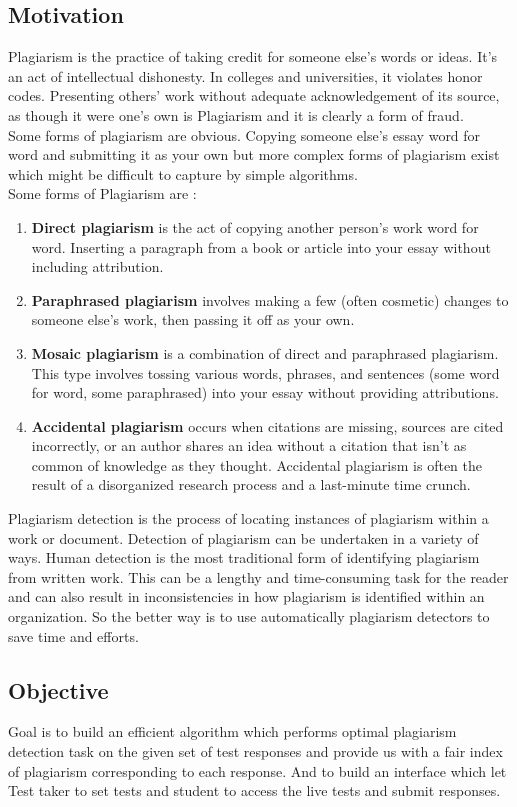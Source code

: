 \subsection{Motivation}

Plagiarism is the practice of taking credit for someone else's words or ideas. It's an act of intellectual dishonesty. In colleges and universities, it violates honor codes. Presenting others' work without adequate acknowledgement of its source, as though it were one’s own is
Plagiarism and it is clearly a form of fraud. \\
Some forms of plagiarism are obvious. Copying someone else's essay word for word and submitting it as your own but more complex forms of plagiarism exist which might be difficult to capture by simple algorithms. \\
Some forms of Plagiarism are :
\begin{enumerate}
    \item \textbf{Direct plagiarism} is the act of copying another person's work word for word. Inserting a paragraph from a book or article into your essay without including attribution.
    \item \textbf{Paraphrased plagiarism} involves making a few (often cosmetic) changes to someone else’s work, then passing it off as your own.
    \item \textbf{Mosaic plagiarism} is a combination of direct and paraphrased plagiarism. This type involves tossing various words, phrases, and sentences (some word for word, some paraphrased) into your essay without providing attributions.
    \item \textbf{Accidental plagiarism} occurs when citations are missing, sources are cited incorrectly, or an author shares an idea without a citation that isn't as common of knowledge as they thought. Accidental plagiarism is often the result of a disorganized research process and a last-minute time crunch. \cite{plag}
\end{enumerate}
Plagiarism detection is the process of locating instances of plagiarism within a work or document. \cite{wiki}Detection of plagiarism can be undertaken in a variety of ways. Human detection is the most traditional form of identifying plagiarism from written work. This can be a lengthy and time-consuming task for the reader and can also result in inconsistencies in how plagiarism is identified within an organization. So the better way is to use automatically plagiarism detectors to save time and efforts.  

\subsection{Objective}
Goal is to build an efficient algorithm which performs optimal plagiarism detection task on the given set of test responses and provide us with a fair index of plagiarism corresponding to each response. And to build an interface which let Test taker to set tests and student to access the live tests and submit responses.


